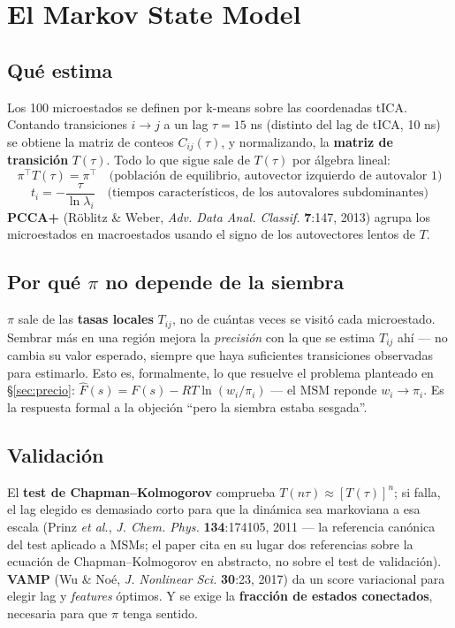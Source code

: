 \documentclass[11pt]{article}
\begin{document}
\section{El Markov State Model}

\subsection{Qué estima}
Los 100 microestados se definen por k-means sobre las coordenadas tICA. Contando transiciones $i\to j$ a un lag $\tau=15$ ns (distinto del lag de tICA, 10 ns) se obtiene la matriz de conteos $C_{ij}(\tau)$, y normalizando, la \textbf{matriz de transición} $T(\tau)$. Todo lo que sigue sale de $T(\tau)$ por álgebra lineal:
$$\pi^\top T(\tau) = \pi^\top \quad\text{(población de equilibrio, autovector izquierdo de autovalor 1)}$$
$$t_i = -\frac{\tau}{\ln\lambda_i} \quad\text{(tiempos característicos, de los autovalores subdominantes)}$$
\textbf{PCCA+} (Röblitz \& Weber, \textit{Adv. Data Anal. Classif.} \textbf{7}:147, 2013) agrupa los microestados en macroestados usando el signo de los autovectores lentos de $T$.

\subsection{Por qué $\pi$ no depende de la siembra}
\begin{resultado}
$\pi$ sale de las \textbf{tasas locales} $T_{ij}$, no de cuántas veces se visitó cada microestado. Sembrar más en una región mejora la \emph{precisión} con la que se estima $T_{ij}$ ahí --- no cambia su valor esperado, siempre que haya suficientes transiciones observadas para estimarlo. Esto es, formalmente, lo que resuelve el problema planteado en \S\ref{sec:precio}: $\hat F(s) = F(s) - RT\ln(w_i/\pi_i)$ --- el MSM reponde $w_i \to \pi_i$. Es la respuesta formal a la objeción ``pero la siembra estaba sesgada''.
\end{resultado}

\subsection{Validación}
El \textbf{test de Chapman--Kolmogorov} comprueba $T(n\tau) \approx [T(\tau)]^n$; si falla, el lag elegido es demasiado corto para que la dinámica sea markoviana a esa escala (Prinz \textit{et al.}, \textit{J. Chem. Phys.} \textbf{134}:174105, 2011 --- la referencia canónica del test aplicado a MSMs; el paper cita en su lugar dos referencias sobre la ecuación de Chapman--Kolmogorov en abstracto, no sobre el test de validación). \textbf{VAMP} (Wu \& Noé, \textit{J. Nonlinear Sci.} \textbf{30}:23, 2017) da un score variacional para elegir lag y \emph{features} óptimos. Y se exige la \textbf{fracción de estados conectados}, necesaria para que $\pi$ tenga sentido.
\end{document}
